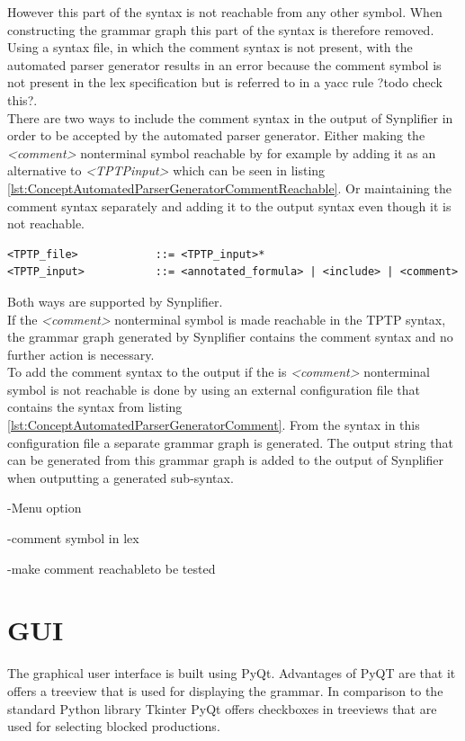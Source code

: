 However this part of the syntax is not reachable from any other symbol.
When constructing the grammar graph this part of the syntax is therefore removed.\\
Using a syntax file, in which the comment syntax is not present, with the automated parser generator results in an error because the comment symbol is not present in the lex specification but is referred to in a yacc rule ?todo check this?.\\
There are two ways to include the comment syntax in the output of \ac{Synplifier} in order to be accepted by the automated parser generator.
Either making the \textit{<comment>} nonterminal symbol reachable by for example by adding it as an alternative to \textit{<TPTP\textunderscore input>} which can be seen in listing \ref{lst:ConceptAutomatedParserGeneratorCommentReachable}.
Or maintaining the comment syntax separately and adding it to the output syntax even though it is not reachable.
\begin{lstlisting}[language=none, basicstyle=\scriptsize, caption=Making the comment syntax reachable, label= lst:ConceptAutomatedParserGeneratorCommentReachable]
<TPTP_file>            ::= <TPTP_input>*
<TPTP_input>           ::= <annotated_formula> | <include> | <comment>
\end{lstlisting}

Both ways are supported by \ac{Synplifier}.\\
If the \textit{<comment>} nonterminal symbol is made reachable in the \ac{TPTP} syntax, the grammar graph generated by \ac{Synplifier} contains the comment syntax and no further action is necessary.\\
To add the comment syntax to the output if the is \textit{<comment>} nonterminal symbol is not reachable is done by using an external configuration file that contains the syntax from listing \ref{lst:ConceptAutomatedParserGeneratorComment}.
From the syntax in this configuration file a separate grammar graph is generated. The output string that can be generated from this grammar graph is added to the output of \ac{Synplifier} when outputting a generated sub-syntax.

-Menu option

-comment symbol in lex

-make comment reachableto be tested
\section{GUI}\label{sec:ConceptGUI}
The graphical user interface is built using PyQt. Advantages of PyQT are that it offers a treeview that is used for displaying the grammar. In comparison to the standard Python library Tkinter PyQt offers checkboxes in treeviews \cite{Tkinter} that are used for selecting blocked productions.


